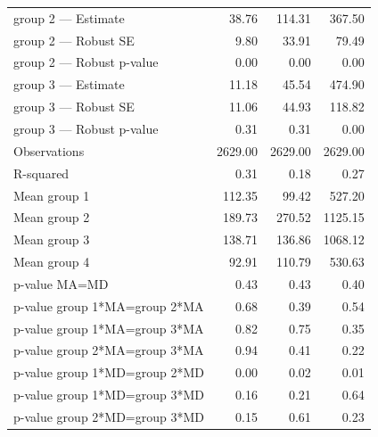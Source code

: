 \begin{tabular}{lrrr}
group 2 — Estimate & 38.76 & 114.31 & 367.50\\
group 2 — Robust SE & 9.80 & 33.91 & 79.49\\
group 2 — Robust p-value & 0.00 & 0.00 & 0.00\\
\addlinespace
group 3 — Estimate & 11.18 & 45.54 & 474.90\\
group 3 — Robust SE & 11.06 & 44.93 & 118.82\\
group 3 — Robust p-value & 0.31 & 0.31 & 0.00\\
Observations & 2629.00 & 2629.00 & 2629.00\\
R-squared & 0.31 & 0.18 & 0.27\\
\addlinespace
Mean group 1 & 112.35 & 99.42 & 527.20\\
Mean group 2 & 189.73 & 270.52 & 1125.15\\
Mean group 3 & 138.71 & 136.86 & 1068.12\\
Mean group 4 & 92.91 & 110.79 & 530.63\\
p-value MA=MD & 0.43 & 0.43 & 0.40\\
\addlinespace
p-value group 1*MA=group 2*MA & 0.68 & 0.39 & 0.54\\
p-value group 1*MA=group 3*MA & 0.82 & 0.75 & 0.35\\
p-value group 2*MA=group 3*MA & 0.94 & 0.41 & 0.22\\
p-value group 1*MD=group 2*MD & 0.00 & 0.02 & 0.01\\
p-value group 1*MD=group 3*MD & 0.16 & 0.21 & 0.64\\
\addlinespace
p-value group 2*MD=group 3*MD & 0.15 & 0.61 & 0.23\\
\bottomrule
\end{tabular}

